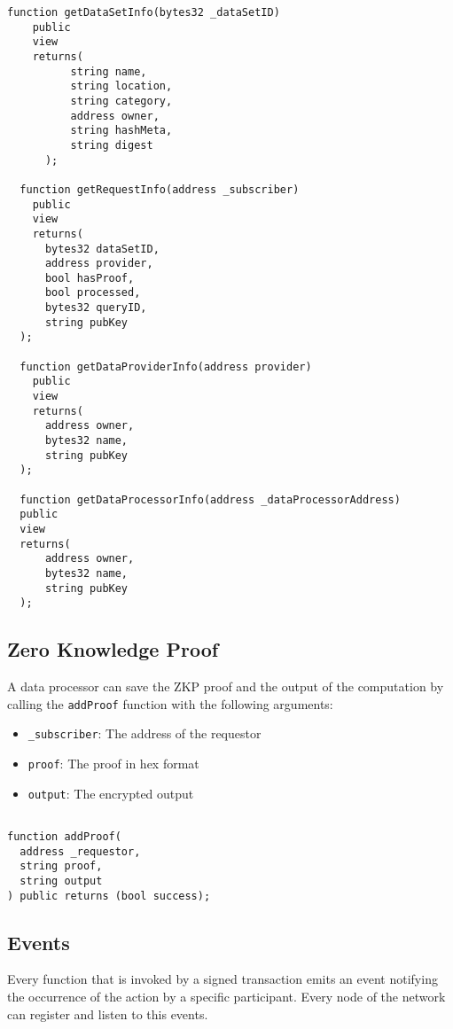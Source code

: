 \begin{lstlisting}[language=Solidity, caption={General functions}]
  function getDataSetInfo(bytes32 _dataSetID)
    public
    view
    returns(
          string name,
          string location,
          string category,
          address owner,
          string hashMeta,
          string digest
      );

  function getRequestInfo(address _subscriber)
    public
    view
    returns(
      bytes32 dataSetID,
      address provider,
      bool hasProof,
      bool processed,
      bytes32 queryID,
      string pubKey
  );

  function getDataProviderInfo(address provider)
    public
    view
    returns(
      address owner,
      bytes32 name,
      string pubKey
  );

  function getDataProcessorInfo(address _dataProcessorAddress)
  public
  view
  returns(
      address owner,
      bytes32 name,
      string pubKey
  );
\end{lstlisting}

\subsection{Zero Knowledge Proof}
\label{implemenation:contracts:zkp}

A data processor can save the ZKP proof and the output of the computation by calling the \verb|addProof| function with the following arguments:

\begin{itemize}
  \item \verb|_subscriber|: The address of the requestor
  \item \verb|proof|: The proof in hex format
  \item \verb|output|: The encrypted output
\end{itemize}

\begin{lstlisting}[language=Solidity, caption={Data sharing application events}]

function addProof(
  address _requestor,
  string proof,
  string output
) public returns (bool success);

\end{lstlisting}
\subsection{Events}
\label{implemenation:contracts:events}

Every function that is invoked by a signed transaction emits an event notifying the occurrence of the action by a specific participant. Every node of the network can register and listen to this events.

